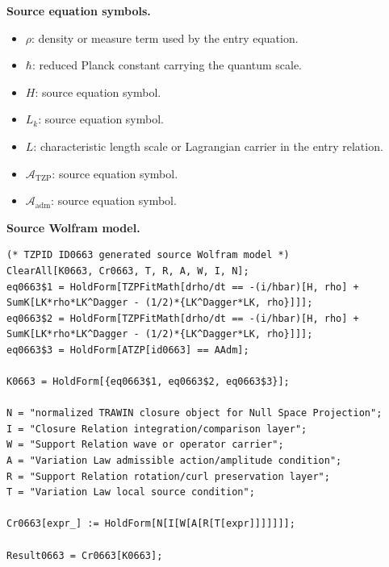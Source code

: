 \begin{minipage}[t]{0.49\linewidth}
\begingroup
\small
\raggedright
\textbf{Source equation symbols.}\par
\begin{itemize}[leftmargin=1.35em,itemsep=1pt,topsep=1pt,parsep=0pt]
    \item $\rho$: density or measure term used by the entry equation.
    \item $\hbar$: reduced Planck constant carrying the quantum scale.
    \item $H$: source equation symbol.
    \item $L_k$: source equation symbol.
    \item $L$: characteristic length scale or Lagrangian carrier in the entry relation.
    \item $\mathcal{A}_{\mathrm{TZP}}$: source equation symbol.
    \item $\mathcal{A}_{\mathrm{adm}}$: source equation symbol.
\end{itemize}
\endgroup
\end{minipage}\hfill
\begin{minipage}[t]{0.47\linewidth}
\begingroup
\scriptsize
\raggedright
\textbf{Source Wolfram model.}\par
\begin{Verbatim}[fontsize=\tiny,breaklines=true,breakanywhere=true]
(* TZPID ID0663 generated source Wolfram model *)
ClearAll[K0663, Cr0663, T, R, A, W, I, N];
eq0663$1 = HoldForm[TZPFitMath[drho/dt == -(i/hbar)[H, rho] + SumK[LK*rho*LK^Dagger - (1/2)*{LK^Dagger*LK, rho}]]];
eq0663$2 = HoldForm[TZPFitMath[drho/dt == -(i/hbar)[H, rho] + SumK[LK*rho*LK^Dagger - (1/2)*{LK^Dagger*LK, rho}]]];
eq0663$3 = HoldForm[ATZP[id0663] == AAdm];

K0663 = HoldForm[{eq0663$1, eq0663$2, eq0663$3}];

N = "normalized TRAWIN closure object for Null Space Projection";
I = "Closure Relation integration/comparison layer";
W = "Support Relation wave or operator carrier";
A = "Variation Law admissible action/amplitude condition";
R = "Support Relation rotation/curl preservation layer";
T = "Variation Law local source condition";

Cr0663[expr_] := HoldForm[N[I[W[A[R[T[expr]]]]]]];

Result0663 = Cr0663[K0663];
\end{Verbatim}
\endgroup
\end{minipage}

